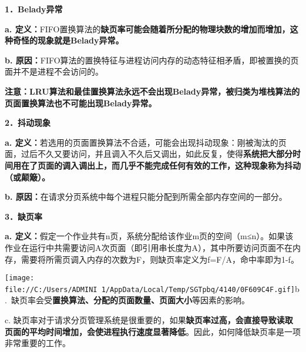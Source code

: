 \textbf{{1．Belady异常}}

\textbf{a.
定义：}{FIFO置换算法的}\textbf{缺页率可能会随着所分配的物理块数的增加而增加，这种奇怪的现象就是Belady异常。}

\textbf{b.
原因：}FIFO算法的置换特征与进程访问内存的动态特征相矛盾，即被置换的页面并不是进程不会访问的。

\textbf{{注意：LRU算法和最佳置换算法永远不会出现Belady异常，被归类为堆栈算法的页面置换算法也不可能出现Belady异常。}}

\textbf{{2．抖动现象}}

\textbf{a.
定义：}{若选用的页面置换算法不合适，可能会出现抖动现象：刚被淘汰的页面，过后不久又要访问，并且调入不久后又调出，如此反复，使得}\textbf{系统把大部分时间用在了页面的调入调出上，而几乎不能完成任何有效的工作，这种现象称为抖动（或颠簸）。}

\textbf{b.
原因：}在请求分页系统中每个进程只能分配到所需全部内存空间的一部分。

\textbf{{3．缺页率}}

\textbf{a.
定义：}{假定一个作业共有n页，系统分配给该作业m页的空间（m≤n）。如果该作业在运行中共需要访问A次页面（即引用串长度为A），其中所要访问页面不在内存，需要将所需页调入内存的次数为F，则缺页率定义为f=F/A，命中率即为1-f。}

\texttt{[image: file://C:/Users/ADMINI~1/AppData/Local/Temp/SGTpbq/4140/0F609C4F.gif]}b.~缺页率会受\textbf{置换算法、分配的页面数量、页面大小}等因素的影响。

c.
缺页率对于请求分页管理系统是很重要的，如果\textbf{缺页率过高，会直接导致读取页面的平均时间增加，会使进程执行速度显著降低}。因此，如何降低缺页率是一项非常重要的工作。
